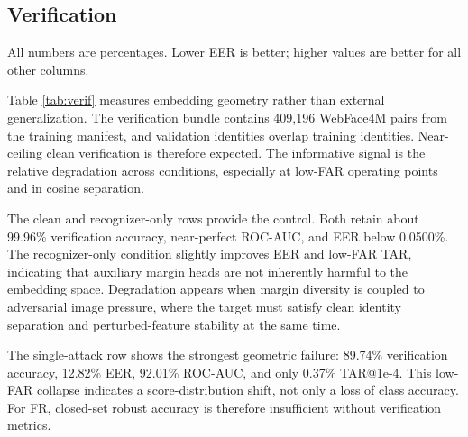 \documentclass[conference]{IEEEtran}
\begin{document}
\subsection{Verification}

\begin{table}[!t]
\centering
\caption{In-domain WebFace4M pair-verification metrics. TAR is reported at low
FAR operating points, following standard FR reporting practice.}
\label{tab:verif}
\vspace{1mm}
\parbox{\columnwidth}{\centering\footnotesize\setlength{\baselineskip}{8pt}
All numbers are percentages. Lower EER is better; higher values are better for all other columns.}
\end{table}

Table \ref{tab:verif} measures embedding geometry rather than external
generalization. The verification bundle contains 409,196 WebFace4M pairs from
the training manifest, and validation identities overlap training identities.
Near-ceiling clean verification is therefore expected. The informative signal
is the relative degradation across conditions, especially at low-FAR operating
points and in cosine separation.

The clean and recognizer-only rows provide the control. Both retain about
99.96\% verification accuracy, near-perfect ROC-AUC, and EER below 0.0500\%.
The recognizer-only condition slightly improves EER and low-FAR TAR, indicating
that auxiliary margin heads are not inherently harmful to the embedding space.
Degradation appears when margin diversity is coupled to adversarial image
pressure, where the target must satisfy clean identity separation and
perturbed-feature stability at the same time.

The single-attack row shows the strongest geometric failure: 89.74\%
verification accuracy, 12.82\% EER, 92.01\% ROC-AUC, and only 0.37\%
TAR@1e-4. This low-FAR collapse indicates a score-distribution shift, not only
a loss of class accuracy. For FR, closed-set robust accuracy is therefore
insufficient without verification metrics.
\end{document}
